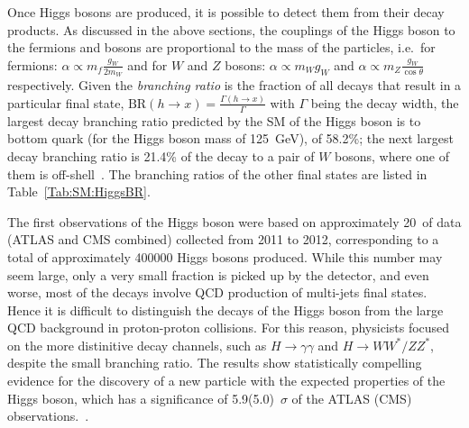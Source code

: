 Once Higgs bosons are produced, it is possible to detect them from their decay products.
As discussed in the above sections, 
the couplings of the Higgs boson to the fermions and bosons are proportional
to the mass of the particles,
i.e.\ for fermions: $ \alpha	\propto m_f \frac{g_W}{2m_W} $ and for $W$ and $Z$ bosons:
$ \alpha	\propto m_W g_W $ and $ \alpha	\propto m_Z \frac{g_W}{\cos \theta} $ respectively. 
Given the \textit{branching ratio} is the fraction of all decays that result in a particular
final state, 
$\text{BR}(h\rightarrow x) = \frac{\Gamma(h\rightarrow x)}{\Gamma}$ 
with $\Gamma$ being the decay width, 
the largest decay branching ratio predicted by the SM of the Higgs boson 
is to bottom quark (for the Higgs boson mass of 125~GeV), of 58.2\%;
the next largest decay branching ratio is 21.4\% of the decay to a pair of $W$ bosons, 
where one of them is off-shell~\cite{YR4}. 
The branching ratios of the other final states are listed in Table~\ref{Tab:SM:HiggsBR}.
\begin{table}[htbp]
    \centering
    \caption{The SM predicted branching ratios in descending order of the Higgs boson
    for $m_H = 125$~GeV. Values taken from Ref.~\cite{YR4}. }
    \label{Tab:SM:HiggsBR}
\end{table}

The first observations of the Higgs 
boson were based on approximately 20~\ifb of data (ATLAS and CMS combined) collected 
from 2011 to 2012,
corresponding to a total of approximately 400000 Higgs bosons produced.
While this number may seem large, only a very small fraction is picked up by
the detector, and even worse, most of the decays involve 
QCD production of multi-jets final states. 
Hence it is difficult to distinguish the decays of the Higgs boson from the large
QCD background in proton-proton collisions. For this reason, 
physicists focused on the more distinitive decay channels, such as 
$H\rightarrow \gamma \gamma$ and $H\rightarrow WW^* / ZZ^*$, despite the small
branching ratio. 
The results show statistically compelling evidence for the 
discovery of a new particle with the expected properties of the Higgs boson, 
which has a significance of 5.9(5.0)~$\sigma$ 
of the ATLAS (CMS) observations.~\cite{HIGG-2012-27,CMS-HIG-12-028}.

